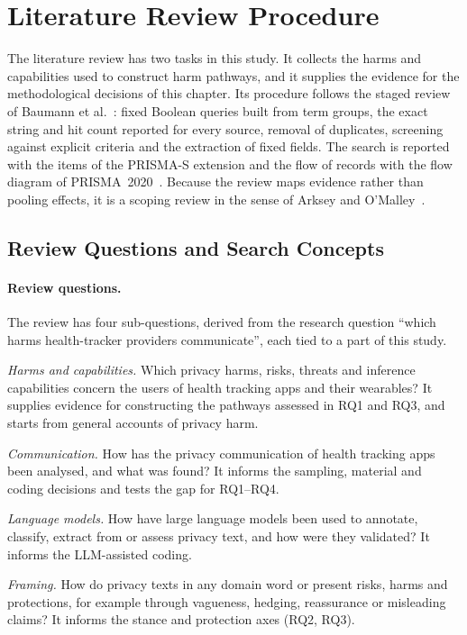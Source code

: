 \section{Literature Review Procedure}
\label{sec:lit-review}
The literature review has two tasks in this study. It collects the harms and capabilities used
to construct harm pathways, and it supplies the evidence for the methodological decisions of
this chapter. Its procedure follows the staged review of Baumann et
al.~\parencite{baumann2025llm}: fixed Boolean queries built from term groups, the exact string
and hit count reported for every source, removal of duplicates, screening against explicit
criteria and the extraction of fixed fields. The search is reported with the items of the
PRISMA-S extension and the flow of records with the flow diagram of
PRISMA~2020~\parencite{rethlefsen2021prisma,page2021prisma}. Because the review maps evidence
rather than pooling effects, it is a scoping review in the sense of Arksey and
O'Malley~\parencite{arksey2005scoping}.

\subsection{Review Questions and Search Concepts}
\label{sec:lit-search}
\paragraph{Review questions.} The review has four sub-questions, derived from the research
question \enquote{which harms health-tracker providers communicate}, each tied to a part of
this study.
\begin{description}[leftmargin=1.5em,itemsep=1pt,topsep=3pt,labelindent=0pt,font=\normalfont\bfseries]
  \item[LQ1] \textit{Harms and capabilities.} Which privacy harms, risks, threats
    and inference capabilities concern the users of health tracking apps and
    their wearables? It supplies evidence for constructing the pathways assessed in RQ1
    and RQ3, and starts from general accounts of privacy harm.
  \item[LQ2] \textit{Communication.} How has the privacy communication of health
    tracking apps been analysed, and what was found? It informs
    the sampling, material and coding decisions and tests the gap for RQ1--RQ4.
  \item[LQ3] \textit{Language models.} How have large language models been used
    to annotate, classify, extract from or assess privacy text, and how were
    they validated? It informs the LLM-assisted coding.
  \item[LQ4] \textit{Framing.} How do privacy texts in any domain word or present
    risks, harms and protections, for example through vagueness, hedging,
    reassurance or misleading claims? It informs the stance and protection axes
    (RQ2, RQ3).
\end{description}

